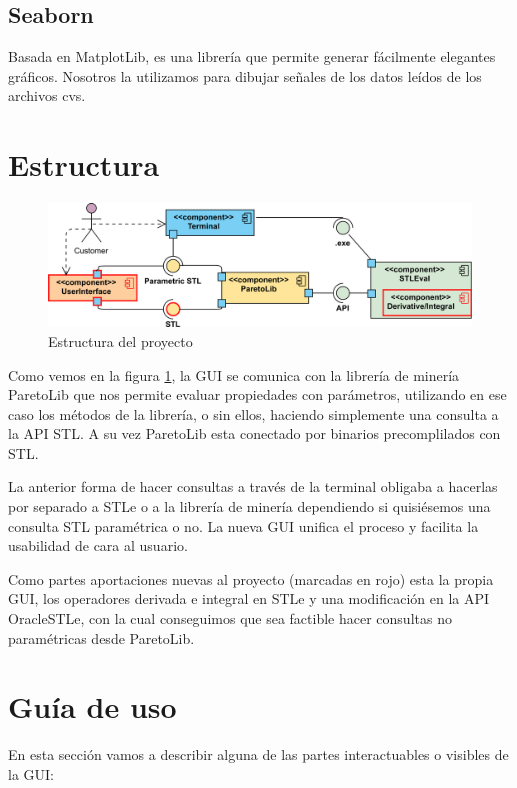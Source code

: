  

\subsection{Seaborn} 
Basada en MatplotLib, es una librería que permite generar fácilmente elegantes gráficos. Nosotros la utilizamos para dibujar señales de los datos leídos de los archivos cvs.
 
 

\section{Estructura}
\begin{figure}[htb]
\centering
  \includegraphics[width=.95\linewidth]{images/uml_diagram} 
\caption{Estructura del proyecto}
\label{fig:est}
\end{figure}
Como vemos en la figura \ref{fig:est}, la GUI se comunica con la librería de minería ParetoLib que nos permite evaluar propiedades con parámetros, utilizando en ese caso los métodos de la librería, o sin ellos, haciendo simplemente una consulta a la API STL. A su vez ParetoLib esta conectado por binarios precomplilados con STL.

La anterior forma de hacer consultas a través de la terminal obligaba a hacerlas por separado a STLe o a la librería de minería dependiendo si quisiésemos una consulta STL paramétrica o no. La nueva GUI unifica el proceso y facilita la usabilidad de cara al usuario.

Como partes aportaciones nuevas al proyecto (marcadas en rojo) esta la propia GUI, los operadores derivada e integral en STLe y una modificación en la API OracleSTLe, con la cual conseguimos que sea factible hacer consultas no paramétricas desde ParetoLib.

\section{Guía de uso}
En esta sección vamos a describir alguna de las partes interactuables o visibles de la GUI:

